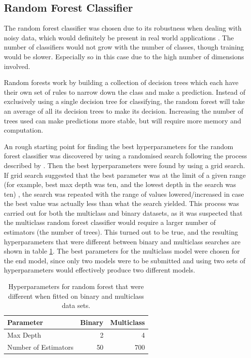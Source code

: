 \documentclass[12pt]{article}
\begin{document}
\subsection{Random Forest Classifier}

The random forest classifier was chosen due to its robustness when dealing with noisy data, which would definitely be present in real world applications \cite{rf}. The number of classifiers would not grow with the number of classes, though training would be slower. Especially so in this case due to the high number of dimensions involved.

Random forests work by building a collection of decision trees which each have their own set of rules to narrow down the class and make a prediction. Instead of exclusively using a single decision tree for classifying, the random forest will take an average of all its decision trees to make its decision. Increasing the number of trees used can make predictions more stable, but will require more memory and computation. 

An rough starting point for finding the best hyperparameters for the random forest classifier was discovered by using a randomised search following the process described by \cite{search}. Then the best hyperparameters were found by using a grid search. If grid search suggested that the best parameter was at the limit of a given range (for example, best max depth was ten, and the lowest depth in the search was ten) , the search was repeated with the range of values lowered/increased in case the best value was actually less than what the search yielded. 
This process was carried out for both the multiclass and binary datasets, as it was suspected that the multiclass random forest classifier would require a larger number of estimators (the number of trees). This turned out to be true, and the resulting hyperparameters that were different between binary and multiclass searches are shown in table \ref{tbl:hyper}. The best parameters for the multiclass model were chosen for the end model, since only two models were to be submitted and using two sets of hyperparameters would effectively produce two different models.

\begin{table}[!h]
\centering
\begin{tabular}{@{}l|rr@{}}
\toprule
Parameter            & Binary & Multiclass \\ \midrule
Max Depth            & 2      & 4          \\
Number of Estimators & 50     & 700       
\end{tabular}
\caption{Hyperparameters for random forest that were different when fitted on binary and multiclass data sets.}
\label{tbl:hyper}
\end{table}
\end{document}
